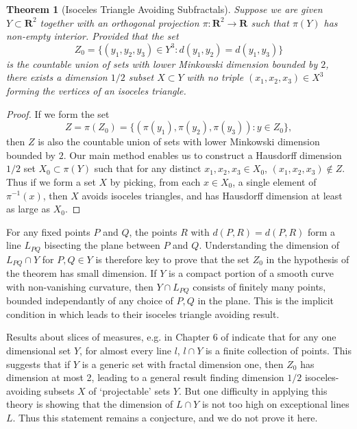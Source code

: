 \documentclass[usenames,dvipsnames]{article}
\theoremstyle{plain}
\theoremstyle{plain}
\newtheorem{theorem}{Theorem}
\begin{document}
\begin{theorem}[Isoceles Triangle Avoiding Subfractals]
	Suppose we are given $Y \subset \mathbf{R}^2$ together with an orthogonal projection $\pi: \mathbf{R}^2 \to \mathbf{R}$ such that $\pi(Y)$ has non-empty interior. Provided that the set
	\[ Z_0 = \{ (y_1,y_2,y_3) \in Y^3 : d(y_1,y_2) = d(y_1,y_3) \} \]
	is the countable union of sets with lower Minkowski dimension bounded by $2$, there exists a dimension $1/2$ subset $X \subset Y$ with no triple $(x_1,x_2,x_3) \in X^3$ forming the vertices of an isoceles triangle.
\end{theorem}
\begin{proof}
	If we form the set
	\[ Z = \pi(Z_0) = \{ (\pi(y_1), \pi(y_2), \pi(y_3)) : y \in Z_0 \}, \]
	then $Z$ is also the countable union of sets with lower Minkowski dimension bounded by $2$. Our main method
	enables us to construct a Hausdorff dimension $1/2$ set $X_0 \subset \pi(Y)$ such that for any distinct $x_1, x_2, x_3 \in X_0$, $(x_1, x_2, x_3) \not \in Z$. Thus if we form a set $X$ by picking, from each $x \in X_0$, a single element of $\pi^{-1}(x)$, then $X$ avoids isoceles triangles, and has Hausdorff dimension at least as large as $X_0$.
\end{proof}

For any fixed points $P$ and $Q$, the points $R$ with $d(P,R) = d(P,R)$ form a line $L_{PQ}$ bisecting the plane between $P$ and $Q$. Understanding the dimension of $L_{PQ} \cap Y$ for $P,Q \in Y$ is therefore key to prove that the set $Z_0$ in the hypothesis of the theorem has small dimension. If $Y$ is a compact portion of a smooth curve with non-vanishing curvature, then $Y \cap L_{PQ}$ consists of finitely many points, bounded independantly of any choice of $P,Q$ in the plane. This is the implicit condition in \cite{MalabikaRob} which leads to their isoceles triangle avoiding result.

Results about slices of measures, e.g. in Chapter 6 of \cite{Matilla} indicate that for any one dimensional set $Y$, for almost every line $l$, $l \cap Y$ is a finite collection of points. This suggests that if $Y$ is a generic set with fractal dimension one, then $Z_0$ has dimension at most 2, leading to a general result finding dimension $1/2$ isoceles-avoiding subsets $X$ of `projectable' sets $Y$. But one difficulty in applying this theory is showing that the dimension of $L \cap Y$ is not too high on exceptional lines $L$. Thus this statement remains a conjecture, and we do not prove it here.
\end{document}
